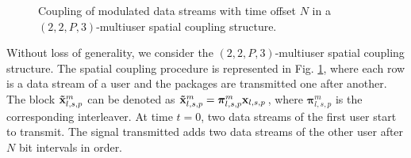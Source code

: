 \documentclass[conference]{IEEEtran}
\begin{document}
\begin{figure}[h!]
\vspace{-0.5em}
\setlength{\abovecaptionskip}{0.cm}
\setlength{\belowcaptionskip}{-0.cm}
  \caption{Coupling of modulated data streams with time offset $N$ in a $\left( {2,2,P,3} \right)$-multiuser spatial coupling structure.}\label{fig.2}
    \vspace{-1em}
\end{figure}
Without loss of generality, we consider the $\left( {2,2,P,3} \right)$-multiuser spatial coupling structure. The spatial coupling procedure is represented in Fig. \ref{fig.2}, where each row is a data stream of a user and the packages are transmitted one after another. The block ${\bf{\tilde x}}_{l,s,p}^m$ can be denoted as ${\bf{\tilde x}}_{l,s,p}^m = {\bm{\pi }}_{l,s,p}^m{{\bf{x}}_{l,s,p}}$, where ${\bm{\pi }}_{l,s,p}^m$ is the corresponding interleaver. At time $t = 0$, two data streams of the first user start to transmit. The signal transmitted adds two data streams of the other user after $N$ bit intervals in order.
\end{document}

